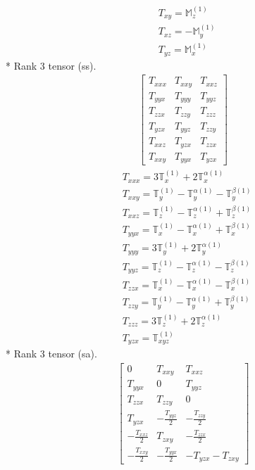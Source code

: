 \documentclass[fleqn,8pt,landscape]{jsarticle}
\begin{document}
\begin{align*}
& T_{xy} = \mathbb{M}_{z}^{(1)} \\
& T_{xz} = - \mathbb{M}_{y}^{(1)} \\
& T_{yz} = \mathbb{M}_{x}^{(1)}
\end{align*}
* Rank 3 tensor (ss).
\begin{align*}
\begin{bmatrix} T_{xxx} & T_{xxy} & T_{xxz} \\ T_{yyx} & T_{yyy} & T_{yyz} \\ T_{zzx} & T_{zzy} & T_{zzz} \\ T_{yzx} & T_{yyz} & T_{zzy} \\ T_{xxz} & T_{yzx} & T_{zzx} \\ T_{xxy} & T_{yyx} & T_{yzx} \end{bmatrix}
\end{align*}
\begin{align*}
& T_{xxx} = 3 \mathbb{T}_{x}^{(1)} + 2 \mathbb{T}_{x}^{\alpha(1)} \\
& T_{xxy} = \mathbb{T}_{y}^{(1)} - \mathbb{T}_{y}^{\alpha(1)} - \mathbb{T}_{y}^{\beta(1)} \\
& T_{xxz} = \mathbb{T}_{z}^{(1)} - \mathbb{T}_{z}^{\alpha(1)} + \mathbb{T}_{z}^{\beta(1)} \\
& T_{yyx} = \mathbb{T}_{x}^{(1)} - \mathbb{T}_{x}^{\alpha(1)} + \mathbb{T}_{x}^{\beta(1)} \\
& T_{yyy} = 3 \mathbb{T}_{y}^{(1)} + 2 \mathbb{T}_{y}^{\alpha(1)} \\
& T_{yyz} = \mathbb{T}_{z}^{(1)} - \mathbb{T}_{z}^{\alpha(1)} - \mathbb{T}_{z}^{\beta(1)} \\
& T_{zzx} = \mathbb{T}_{x}^{(1)} - \mathbb{T}_{x}^{\alpha(1)} - \mathbb{T}_{x}^{\beta(1)} \\
& T_{zzy} = \mathbb{T}_{y}^{(1)} - \mathbb{T}_{y}^{\alpha(1)} + \mathbb{T}_{y}^{\beta(1)} \\
& T_{zzz} = 3 \mathbb{T}_{z}^{(1)} + 2 \mathbb{T}_{z}^{\alpha(1)} \\
& T_{yzx} = \mathbb{T}_{xyz}^{(1)}
\end{align*}
* Rank 3 tensor (sa).
\begin{align*}
\begin{bmatrix} 0 & T_{xxy} & T_{xxz} \\ T_{yyx} & 0 & T_{yyz} \\ T_{zzx} & T_{zzy} & 0 \\ T_{yzx} & - \frac{T_{yyz}}{2} & - \frac{T_{zzy}}{2} \\ - \frac{T_{xxz}}{2} & T_{zxy} & - \frac{T_{zzx}}{2} \\ - \frac{T_{xxy}}{2} & - \frac{T_{yyx}}{2} & - T_{yzx} - T_{zxy} \end{bmatrix}
\end{align*}
\end{document}
